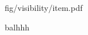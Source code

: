 \begin{figure}[t]
\centering
\begin{overpic} 
[width=\linewidth]
{fig/visibility/item.pdf}
\end{overpic}
\caption{balhhh}
\label{fig:visibility}
\end{figure}